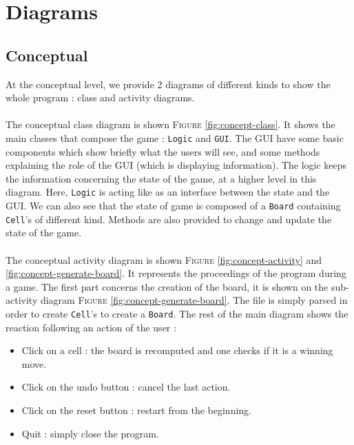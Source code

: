\documentclass[a4paper,11pt]{article}
\begin{document}
\section{Diagrams}
\label{sec:diagrams}
	
	\subsection{Conceptual}

At the conceptual level, we provide 2 diagrams of different kinds to show the whole program : class and activity diagrams.

\paragraph{}

The conceptual class diagram is shown \textsc{Figure} \ref{fig:concept-class}. It shows the main classes that compose the game : \texttt{Logic} and \texttt{GUI}. The GUI have some basic components which show briefly what the users will see, and some methods explaining the role of the GUI (which is displaying information). The logic keeps the information concerning the state of the game, at a higher level in this diagram. Here, \texttt{Logic} is acting like as an interface between the state and the GUI. We can also see that the state of game is composed of a \texttt{Board} containing \texttt{Cell}'s of different kind. Methods are also provided to change and update the state of the game.

\paragraph{}

The conceptual activity diagram is shown \textsc{Figure} \ref{fig:concept-activity} and \ref{fig:concept-generate-board}. It represents the proceedings of the program during a game. The first part concerns the creation of the board, it is shown on the sub-activity diagram \textsc{Figure} \ref{fig:concept-generate-board}. The file is simply parsed in order to create \texttt{Cell}'s to create a \texttt{Board}. The rest of the main diagram shows the reaction following an action of the user : 
\begin{itemize}
	\item Click on a cell : the board is recomputed and one checks if it is a winning move.
	\item Click on the undo button : cancel the last action.
	\item Click on the reset button : restart from the beginning.
	\item Quit : simply close the program.
\end{itemize}
\end{document}
